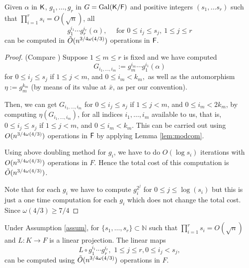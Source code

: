\begin{lemma}\label{lem:selfcomp}
Given $\alpha$ in ${\mathsf{K}}$, $g_1, \ldots , g_{r}$ in $G =
\mathrm{Gal}({\mathsf{K}}/{\mathsf{F}})$ and positive integers $(s_1, \ldots s_r)$ such
that $\prod_{i = 1}^r s_i = O(\sqrt{n})$, all
  $$g_1^{i_1}\cdots g_r^{i_r}(\alpha) ,\quad \text{~for~} 0 \leq i_j
\leq s_j,\ 1 \leq j \leq r$$ can be computed in $\tilde{O}(n^{3/4 \omega(4/3)})$
operations in ${\mathsf{F}}$.
\end{lemma}
\begin{proof}
(Compare \cite[Lemma~4]{Kaltofen}) Suppose $1 \leq m \leq r$ is
  fixed and we have computed 
$$G_{i_1,\dots,i_m}:=g_m^{i_m}\cdots g_1^{i_1}(\alpha)$$ for $0 \leq
  i_j \leq s_j$ if $1 \leq j < m$, and $0 \leq i_m < k_m,$ as well as
  the automorphism $\eta:=g_m^{k_m}$ (by means of its value at $\bar
  x$, as per our convention).
  
 Then, we can get $G_{i_1,\dots,i_m}$ for $0 \leq i_j \leq s_j$ if $1
 \leq j < m$, and $0 \leq i_m < 2k_m$, by computing
 $\eta(G_{i_1,\dots,i_m})$, for all indices $i_1,\dots,i_m$
 available to us, that is, $0 \leq i_j \leq s_j$ if $1 \leq j < m$,
 and $0 \leq i_m < k_m$. This can be carried out using $O(n^{3/4 \omega(4/3)})$
 operations in ${\mathsf{F}}$ by applying Lemma \ref{lem:modcom}.

 Using above doubling method for $g_i$, we have to
 do $O(\log s_i)$ iterations with $O(n^{3/4 \omega(4/3)})$ operations in $F$. Hence
 the total cost of this computation is $\tilde{O}(n^{3/4 \omega(4/3)})$.

Note that for each $g_i$ we have to compute $g_i^{2^j}$ for $0 \leq j
\leq \log(s_i)$ but this is just a one time computation for each $g_i$
which does not change the total cost. Since $\omega(4/3) \ge 7/4$
\end{proof}

\begin{lemma}\label{lem:transmodcomp}
Under Assumption \ref{assum}, for $\lbrace s_1, \ldots, s_r \rbrace \subset \mathbb{N}$
such that $\prod_{i = 1}^r s_i = O(\sqrt{n})$
 and $L: K\rightarrow F$ is a linear projection. The linear maps
$$L \circ g_1^{i_1} \cdots g_r^{i_r}, \,\, 1\leq j \leq r, 0 \leq i_j < s_j, $$ can be computed using $\tilde{O}(n^{3/4 \omega(4/3)})$ operations in $F$. 
\end{lemma} 

